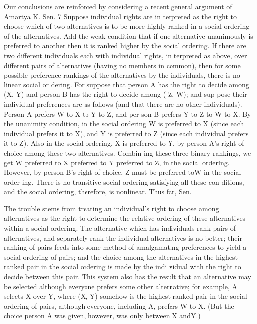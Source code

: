 \documentclass[11pt,openany]{book}
\begin{document}
Our conclusions are reinforced by considering a recent general argument of Amartya K. Sen. 7 Suppose individual rights are in terpreted as the right to choose which of two alternatives is to be more highly ranked in a social ordering of the alternatives. Add the weak condition that if one alternative unanimously is preferred to another then it is ranked higher by the social ordering. If there are two different individuals each with individual rights, in terpreted as above, over different pairs of alternatives (having no members in common), then for some possible preference rankings of the alternatives by the individuals, there is no linear social or dering. For suppose that person A has the right to decide among (X, Y) and person B has the right to decide among ( Z, W); and sup pose their individual preferences are as follows (and that there are no other individuals). Person A prefers W to X to Y to Z, and per son B prefers Y to Z to W to X. By the unanimity condition, in the social ordering W is preferred to X (since each individual prefers it to X), and Y is preferred to Z (since each individual prefers it to Z). Also in the social ordering, X is preferred to Y, by person A's right of choice among these two alternatives. Combin ing these three binary rankings, we get W preferred to X preferred to Y preferred to Z, in the social ordering. However, by person B's right of choice, Z must be preferred toW in the social order ing. There is no transitive social ordering satisfying all these con ditions, and the social ordering, therefore, is nonlinear. Thus far, Sen. 

The trouble stems from treating an individual's right to choose among alternatives as the right to determine the relative ordering of these alternatives within a social ordering. The alternative which has individuals rank pairs of alternatives, and separately rank the individual alternatives is no better; their ranking of pairs feeds into some method of amalgamating preferences to yield a social ordering of pairs; and the choice among the alternatives in the highest ranked pair in the social ordering is made by the indi vidual with the right to decide between this pair. This system also has the result that an alternative may be selected although everyone prefers some other alternative; for example, A selects X over Y, where (X, Y) somehow is the highest ranked pair in the social ordering of pairs, although everyone, including A, prefers W to X. (But the choice person A was given, however, was only between X andY.) 
\end{document}
